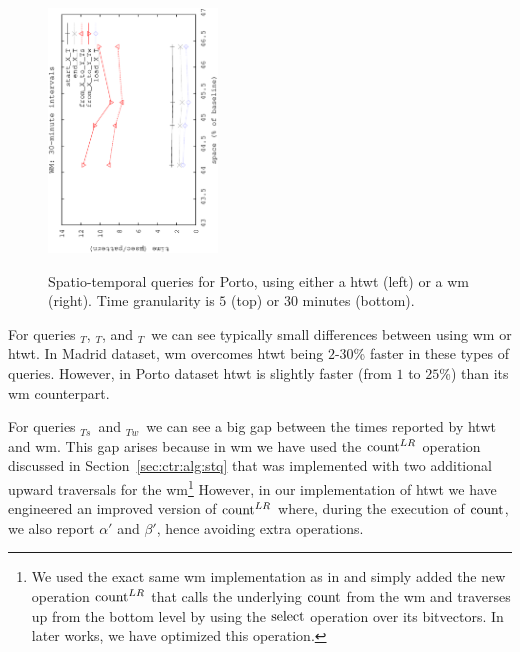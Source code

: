 \begin{figure}[ht]
\begin{center}
			{\includegraphics[angle=-90,width=0.4\textwidth]{figures_synt/porto_wm30.eps}}
		\end{center}
		\caption{Spatio-temporal queries for Porto, using either a \acrshort{htwt} (left) or a \acrshort{wm} (right). 
			Time granularity is $5$ (top) or $30$ minutes (bottom). 
		}
		\label{fig:ctr:exp:queries:st:porto}
	\end{figure}


	For queries \startX$_T$, \endX$_T$, and \loadX$_T$\ we can see typically small differences between using \gls{wm} or \gls{htwt}. In Madrid dataset, \gls{wm} overcomes \gls{htwt} being $2$-$30$\% faster in these types of queries. 
	However, in Porto dataset \gls{htwt} is slightly 
	faster (from $1$ to $25$\%) than its \gls{wm} counterpart.

	For queries \XtoY$_{Ts}$\ and \XtoY$_{Tw}$\ we can see a big gap between the times reported by \gls{htwt} and \gls{wm}.
	This gap arises because in \gls{wm} we have used the $\operatorname{count}^{LR}$ operation discussed in Section~\ref{sec:ctr:alg:stq}
	that was implemented with two additional upward traversals for the \gls{wm}\footnote{We used the exact same \gls{wm} 
		implementation as in \cite{CNO15} and simply added the new operation $\operatorname{count}^{LR}$ that calls the underlying $\operatorname{count}$ from the
		\gls{wm} and traverses up from the bottom level by using the $\operatorname{select}$ operation over its bitvectors. In later works, we have optimized this operation.}  
	However, in our implementation of
	\gls{htwt} we have engineered an improved version of $\operatorname{count}^{LR}$ where, during the execution of $\operatorname{count}$, we also report $\alpha'$ and  $\beta'$, hence avoiding extra operations.
	

